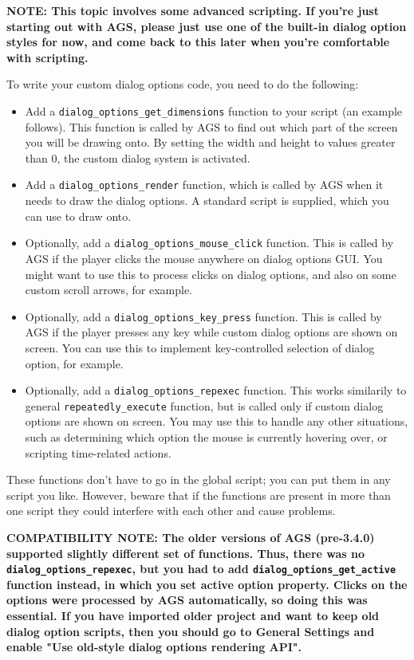 \bf{NOTE:} This topic involves some advanced scripting. If you're just starting out with AGS,
please just use one of the built-in dialog option styles for now, and come back to this later
when you're comfortable with scripting.

To write your custom dialog options code, you need to do the following:
\begin{itemize}
\item Add a \verb$dialog_options_get_dimensions$ function to your script (an example follows).
This function is called by AGS to find out which part of the screen you will be drawing onto.
By setting the width and height to values greater than 0, the custom dialog system is activated.
\item Add a \verb$dialog_options_render$ function, which is called by AGS when it needs to
draw the dialog options. A standard script  is
supplied, which you can use to draw onto.
\item Optionally, add a \verb$dialog_options_mouse_click$ function. This is called by AGS if the
player clicks the mouse anywhere on dialog options GUI. You might want to use this to process
clicks on dialog options, and also on some custom scroll arrows, for example.
\item Optionally, add a \verb$dialog_options_key_press$ function. This is called by AGS if the
player presses any key while custom dialog options are shown on screen. You can use this to
implement key-controlled selection of dialog option, for example.
\item Optionally, add a \verb$dialog_options_repexec$ function. This works similarily to
general \verb$repeatedly_execute$ function, but is called only if custom dialog options are
shown on screen. You may use this to handle any other situations, such as determining which
option the mouse is currently hovering over, or scripting time-related actions.
\end{itemize}

These functions don't have to go in the global script; you can put them in any script you like.
However, beware that if the functions are present in more than one script they could interfere
with each other and cause problems.

\bf{COMPATIBILITY NOTE:} The older versions of AGS (pre-3.4.0) supported slightly different set
of functions. Thus, there was no \verb$dialog_options_repexec$, but you had to add
\verb$dialog_options_get_active$ function instead, in which you set active option property.
Clicks on the options were processed by AGS automatically, so doing this was essential.
If you have imported older project and want to keep old dialog option scripts, then you should
go to General Settings and enable "Use old-style dialog options rendering API".

